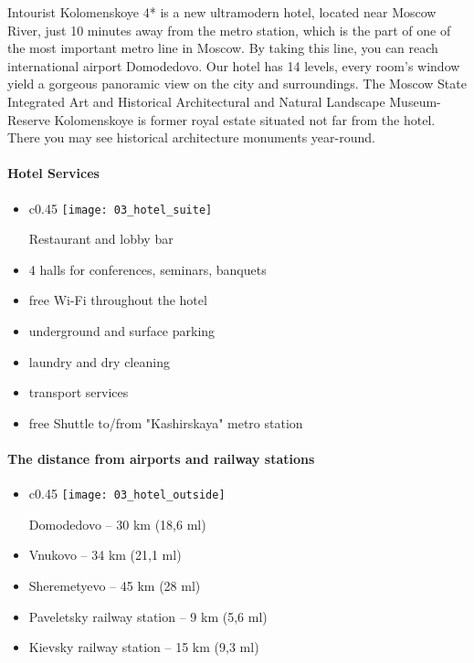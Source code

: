 \documentclass[10pt,fleqn,openany]{book} %
\begin{document}

Intourist Kolomenskoye 4* is a new ultramodern hotel, located near Moscow River, just 10 minutes away from the metro station, which is the part of one of the most important metro line in Moscow. By taking this line, you can reach international airport Domodedovo. Our hotel has 14 levels, every room’s window yield a gorgeous panoramic view on the city and surroundings. The Moscow State Integrated Art and Historical Architectural and Natural Landscape Museum-Reserve Kolomenskoye is former royal estate situated not far from the hotel. There you may see historical architecture monuments year-round. 

\vfill
{}

\paragraph{Hotel Services}
\begin{itemize}
	\item \parbox[t]{\dimexpr\textwidth-\leftmargin}{
		\vspace{-2.5mm}				
		\begin{wrapfigure}{c}{0.45\textwidth}
			\vspace{-25pt}				
			\centering				
			\texttt{[image: 03\_hotel\_suite]}
		\end{wrapfigure}
		Restaurant and lobby bar
	}
	\item 4 halls for conferences, seminars, banquets
	\item free Wi-Fi throughout the hotel
	\item underground and surface parking
	\item laundry and dry cleaning
	\item transport services
	\item free Shuttle to/from "Kashirskaya" metro station
\end{itemize}

\paragraph{The distance from airports and railway stations}
\begin{itemize}
	\item \parbox[t]{\dimexpr\textwidth-\leftmargin}{
		\vspace{-2.5mm}				
		\begin{wrapfigure}{c}{0.45\textwidth}
			\vspace{-25pt}				
			\centering				
			\texttt{[image: 03\_hotel\_outside]}
		\end{wrapfigure}
		Domodedovo – 30 km (18,6 ml)
	}
	\item Vnukovo – 34 km (21,1 ml)
	\item Sheremetyevo – 45 km (28 ml)
	\item Paveletsky railway station – 9 km (5,6 ml)
	\item Kievsky railway station – 15 km (9,3 ml)
\end{itemize}
\end{document}
